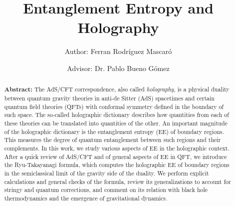 \documentclass[twocolumn]{revtex4}
\begin{document}
\pagestyle{fancy}


\title{Entanglement Entropy and Holography}
\author{Author: Ferran Rodríguez Mascaró}
\author{Advisor: Dr. Pablo Bueno Gómez}


\begin{abstract}
    {\bf Abstract:} The AdS/CFT correspondence, also called \emph{holography}, is a physical duality between quantum gravity theories in anti-de Sitter (AdS) spacetimes and certain quantum field theories (QFTs) with conformal symmetry defined in the boundary of such space. The so-called holographic dictionary describes how quantities from each of these theories can be translated into quantities of the other. An important magnitude of the holographic dictionary is the entanglement entropy (EE) of boundary regions. This measures the degree of quantum entanglement between such regions and their complements. In this work, we study various aspects of EE in the holographic context. After a quick review of AdS/CFT and of general aspects of EE in QFT, we introduce the Ryu-Takayanagi formula, which computes the holographic EE of boundary regions in the semiclassical limit of the gravity side of the duality. We perform explicit calculations and general checks of the formula, review its generalizations to account for stringy and quantum corrections, and comment on its relation with black hole thermodynamics and the emergence of gravitational dynamics.
\end{abstract}


\maketitle
\end{document}
